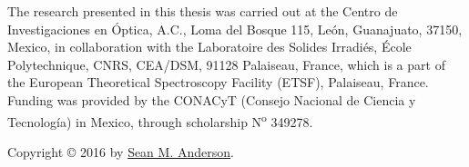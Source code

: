 \null
\vfill
\begin{flushleft}
The research presented in this thesis was carried out at the Centro de
Investigaciones en \'Optica, A.C., Loma del Bosque 115, Le\'on, Guanajuato,
37150, Mexico, in collaboration with the Laboratoire des Solides Irradi\'es,
\'Ecole Polytechnique, CNRS, CEA/DSM, 91128 Palaiseau, France, which is a part
of the European Theoretical Spectroscopy Facility (ETSF), Palaiseau, France.
Funding was provided by the CONACyT (Consejo Nacional de Ciencia y Tecnolog\'ia)
in Mexico, through scholarship N\textsuperscript{o} 349278.

\vspace{1cm}

Copyright {\copyright{}} 2016 by 
\href{mailto:sean.martin.anderson@gmail.com}{Sean M. Anderson}.
\end{flushleft}

\clearpage
